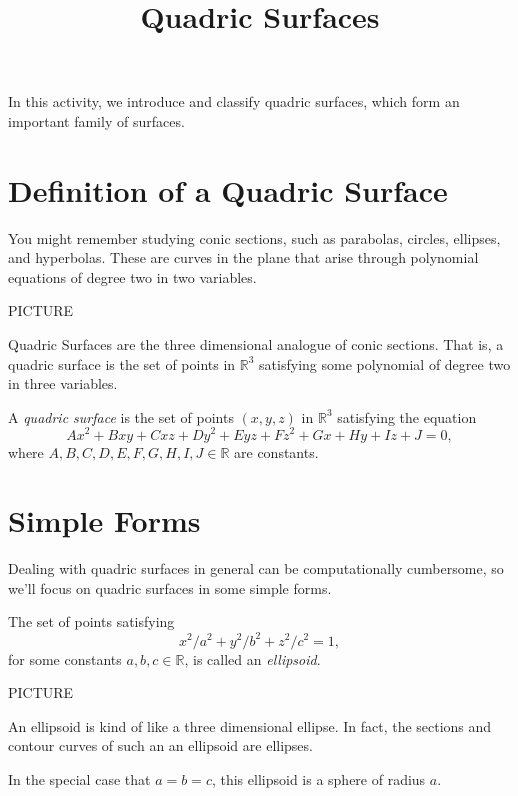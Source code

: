 \documentclass{ximera}
\title{Quadric Surfaces}
\begin{document}
\begin{abstract}
\end{abstract}
\maketitle


In this activity, we introduce and classify quadric surfaces, which form an important family of surfaces.

\section{Definition of a Quadric Surface}

You might remember studying conic sections, such as parabolas, circles, ellipses, and hyperbolas. These are curves in the plane that arise through polynomial equations of degree two in two variables.

PICTURE

Quadric Surfaces are the three dimensional analogue of conic sections. That is, a quadric surface is the set of points in $\mathbb{R}^3$ satisfying some polynomial of degree two in three variables.

\begin{definition}
A \emph{quadric surface} is the set of points $(x,y,z)$ in $\mathbb{R}^3$ satisfying the equation
\[
Ax^2 + Bxy + Cxz + Dy^2 + Eyz + Fz^2 +Gx + Hy + Iz + J = 0,
\]
where $A,B,C,D,E,F,G,H,I,J\in\mathbb{R}$ are constants.
\end{definition}

\section{Simple Forms}

Dealing with quadric surfaces in general can be computationally cumbersome, so we'll focus on quadric surfaces in some simple forms.

\begin{example}
The set of points satisfying
\[
x^2/a^2 + y^2/b^2 + z^2/c^2 = 1,
\]
for some constants $a,b,c\in\mathbb{R}$, is called an \emph{ellipsoid}.

PICTURE

An ellipsoid is kind of like a three dimensional ellipse. In fact, the sections and contour curves of such an an ellipsoid are ellipses.

In the special case that $a=b=c$, this ellipsoid is a sphere of radius $a$.
\end{example}
\end{document}
